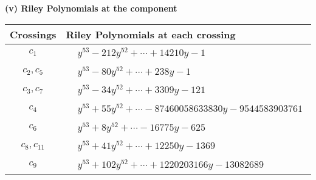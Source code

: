 \documentclass[1p]{elsarticle_modified}
\theoremstyle{definition}
\begin{document}
\newpage\renewcommand{\arraystretch}{1}
\flushleft \textbf{(v) Riley Polynomials at the component}\newline \\
\begin{tabular}{m{50pt}|m{274pt}}
Crossings & \hspace{64pt}Riley Polynomials at each crossing \\
\hline $$\begin{aligned}c_{1}\end{aligned}$$&$\begin{aligned}
&y^{53}-212 y^{52}+\cdots+14210 y-1
\end{aligned}$\\
\hline $$\begin{aligned}c_{2},c_{5}\end{aligned}$$&$\begin{aligned}
&y^{53}-80 y^{52}+\cdots+238 y-1
\end{aligned}$\\
\hline $$\begin{aligned}c_{3},c_{7}\end{aligned}$$&$\begin{aligned}
&y^{53}-34 y^{52}+\cdots+3309 y-121
\end{aligned}$\\
\hline $$\begin{aligned}c_{4}\end{aligned}$$&$\begin{aligned}
&y^{53}+55 y^{52}+\cdots-87460058633830 y-9544583903761
\end{aligned}$\\
\hline $$\begin{aligned}c_{6}\end{aligned}$$&$\begin{aligned}
&y^{53}+8 y^{52}+\cdots-16775 y-625
\end{aligned}$\\
\hline $$\begin{aligned}c_{8},c_{11}\end{aligned}$$&$\begin{aligned}
&y^{53}+41 y^{52}+\cdots+12250 y-1369
\end{aligned}$\\
\hline $$\begin{aligned}c_{9}\end{aligned}$$&$\begin{aligned}
&y^{53}+102 y^{52}+\cdots+1220203166 y-13082689
\end{aligned}$\\

\end{tabular}
\end{document}
